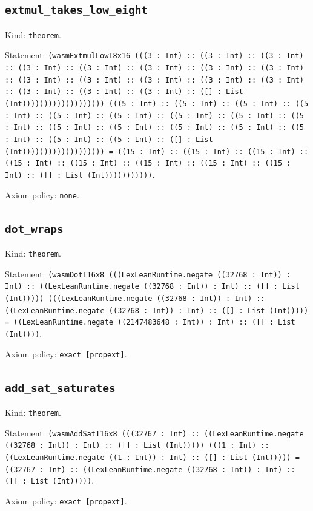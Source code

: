 \documentclass[11pt]{article}
\begin{document}
\subsection*{\texttt{extmul\_takes\_low\_eight}}
\noindent Kind: \texttt{theorem}.\par
\noindent Statement: \texttt{(wasmExtmulLowI8x16 (((3 : Int) :: ((3 : Int) :: ((3 : Int) :: ((3 : Int) :: ((3 : Int) :: ((3 : Int) :: ((3 : Int) :: ((3 : Int) :: ((3 : Int) :: ((3 : Int) :: ((3 : Int) :: ((3 : Int) :: ((3 : Int) :: ((3 : Int) :: ((3 : Int) :: ((3 : Int) :: ([] : List (Int))))))))))))))))))) (((5 : Int) :: ((5 : Int) :: ((5 : Int) :: ((5 : Int) :: ((5 : Int) :: ((5 : Int) :: ((5 : Int) :: ((5 : Int) :: ((5 : Int) :: ((5 : Int) :: ((5 : Int) :: ((5 : Int) :: ((5 : Int) :: ((5 : Int) :: ((5 : Int) :: ((5 : Int) :: ([] : List (Int))))))))))))))))))) = ((15 : Int) :: ((15 : Int) :: ((15 : Int) :: ((15 : Int) :: ((15 : Int) :: ((15 : Int) :: ((15 : Int) :: ((15 : Int) :: ([] : List (Int)))))))))))}.\par
\noindent Axiom policy: \texttt{none}.\par
\subsection*{\texttt{dot\_wraps}}
\noindent Kind: \texttt{theorem}.\par
\noindent Statement: \texttt{(wasmDotI16x8 (((LexLeanRuntime.negate ((32768 : Int)) : Int) :: ((LexLeanRuntime.negate ((32768 : Int)) : Int) :: ([] : List (Int))))) (((LexLeanRuntime.negate ((32768 : Int)) : Int) :: ((LexLeanRuntime.negate ((32768 : Int)) : Int) :: ([] : List (Int))))) = ((LexLeanRuntime.negate ((2147483648 : Int)) : Int) :: ([] : List (Int))))}.\par
\noindent Axiom policy: \texttt{exact [propext]}.\par
\subsection*{\texttt{add\_sat\_saturates}}
\noindent Kind: \texttt{theorem}.\par
\noindent Statement: \texttt{(wasmAddSatI16x8 (((32767 : Int) :: ((LexLeanRuntime.negate ((32768 : Int)) : Int) :: ([] : List (Int))))) (((1 : Int) :: ((LexLeanRuntime.negate ((1 : Int)) : Int) :: ([] : List (Int))))) = ((32767 : Int) :: ((LexLeanRuntime.negate ((32768 : Int)) : Int) :: ([] : List (Int)))))}.\par
\noindent Axiom policy: \texttt{exact [propext]}.\par
\end{document}
